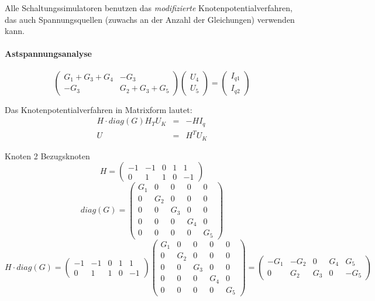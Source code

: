 \documentclass[german]{article}
\begin{document}
Alle Schaltungssimulatoren benutzen das {\it modifizierte} Knotenpotentialverfahren, das auch Spannungsquellen (zuwachs an der Anzahl der Gleichungen) verwenden kann.

\paragraph{Astspannungsanalyse}

\[
	\begin{pmatrix}
		G_1 + G_3 + G_4 & -G_3\\
		-G_3 & G_2 + G_3 + G_5
	\end{pmatrix}
	\begin{pmatrix}
		U_4 \\
		U_5
	\end{pmatrix}
	=
	\begin{pmatrix}
		I_{q1} \\
		I_{q2}
	\end{pmatrix}
\]

Das Knotenpotentialverfahren in Matrixform lautet:
\begin{eqnarray*}
	H \cdot diag(G) H_T U_K & = & - H I_q \\
	U & = & H^T U_K
\end{eqnarray*}

Knoten 2 Bezugsknoten
\[
	H = \begin{pmatrix}
		-1 & -1 & 0 & 1 & 1 \\
		0 & 1 & 1 & 0 & -1
	\end{pmatrix}
\]
\[
	diag(G) = \begin{pmatrix}
		G_1 & 0 & 0 & 0 & 0 \\
		0 & G_2 & 0 & 0 & 0 \\
		0 & 0 & G_3 & 0 & 0 \\
		0 & 0 & 0 & G_4 & 0 \\
		0 & 0 & 0 & 0 & G_5
	\end{pmatrix}
\]
\[
	H \cdot diag(G) =
	\begin{pmatrix}
		-1 & -1 & 0 & 1 & 1 \\
		0 & 1 & 1 & 0 & -1
	\end{pmatrix}
	\begin{pmatrix}
		G_1 & 0 & 0 & 0 & 0 \\
		0 & G_2 & 0 & 0 & 0 \\
		0 & 0 & G_3 & 0 & 0 \\
		0 & 0 & 0 & G_4 & 0 \\
		0 & 0 & 0 & 0 & G_5
	\end{pmatrix}
	=
	\begin{pmatrix}
		-G_1 & -G_2 & 0 & G_4 & G_5 \\
		0 & G_2 & G_3 & 0 & -G_5
	\end{pmatrix}
\]
\end{document}
